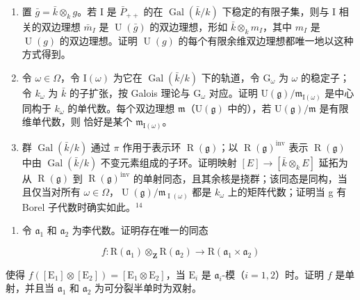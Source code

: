 \begin{enumerate}
\def\labelenumi{\alph{enumi})}
\item
  置 \(\bar{g} = \bar{k} \otimes_{k} g\)。若 I 是 \(\bar{P}_{++}\) 的在 \(\operatorname{Gal}(\bar{k}/k)\) 下稳定的有限子集，则与 I 相关的双边理想 \(\bar{m}_{I}\) 是 \(\operatorname{U}(\bar{g})\) 的双边理想，形如 \(\bar{k} \otimes_{k} m_{I}\)，其中 \(m_{I}\) 是 \(\operatorname{U}(g)\) 的双边理想。证明 \(\operatorname{U}(g)\) 的每个有限余维双边理想都唯一地以这种方式得到。
\item
  令 \(\omega \in \Omega\)，令 \(\mathrm{I}(\omega)\) 为它在 \(\operatorname{Gal}(\bar{k}/k)\) 下的轨道，令 \(\mathrm{G}_{\omega}\) 为 \(\omega\) 的稳定子；令 \(k_{\omega}\) 为 \(\bar{k}\) 的子扩张，按 Galois 理论与 \(\mathrm{G}_{\omega}\) 对应。证明 \(\mathrm{U}(\mathfrak{g})/\mathfrak{m}_{\mathrm{I}(\omega)}\) 是中心同构于 \(k_{\omega}\) 的单代数。每个双边理想 \(\mathfrak{m}\)（\(\mathrm{U}(\mathfrak{g})\) 中的），若 \(\mathrm{U}(\mathfrak{g})/\mathfrak{m}\) 是有限维单代数，则  恰好是某个 \(\mathfrak{m}_{\mathrm{I}(\omega)}\)。
\item
  群 \(\operatorname{Gal}(\bar{k}/k)\) 通过 \(\pi\) 作用于表示环 \(\operatorname{R}(\mathfrak{g})\)；以 \(\operatorname{R}(\mathfrak{g})^{\mathrm{inv}}\) 表示 \(\operatorname{R}(\mathfrak{g})\) 中由 \(\operatorname{Gal}(\bar{k}/k)\) 不变元素组成的子环。证明映射 \([E] \to [\bar{k} \otimes_{k} E]\) 延拓为从 \(\operatorname{R}(\mathfrak{g})\) 到 \(\operatorname{R}(\mathfrak{g})^{\mathrm{inv}}\) 的单射同态，且其余核是挠群；该同态是同构，当且仅当对所有 \(\omega \in \Omega\)，\(\operatorname{U}(\mathfrak{g})/\mathfrak{m}_{\operatorname{I}(\omega)}\) 都是 \(k_{\omega}\) 上的矩阵代数；证明当 g 有 Borel 子代数时确实如此。\(^{14}\)
\end{enumerate}

\begin{enumerate}
\def\labelenumi{\arabic{enumi})}
\setcounter{enumi}{8}
\tightlist
\item
  令 \(\mathfrak{a}_1\) 和 \(\mathfrak{a}_2\) 为李代数。证明存在唯一的同态
\end{enumerate}

\[
f: \mathrm{R} (\mathfrak {a} _ {1}) \otimes_ {\mathbf {Z}} \mathrm{R} (\mathfrak {a} _ {2}) \to \mathrm{R} (\mathfrak {a} _ {1} \times \mathfrak {a} _ {2})
\]

使得 \(f([\mathrm{E}_1] \otimes [\mathrm{E}_2]) = [\mathrm{E}_1 \otimes \mathrm{E}_2]\)，当 \(\mathrm{E}_i\) 是 \(\mathfrak{a}_i\)-模（\(i = 1, 2\)）时。证明 \(f\) 是单射，并且当 \(\mathfrak{a}_1\) 和 \(\mathfrak{a}_2\) 为可分裂半单时为双射。


